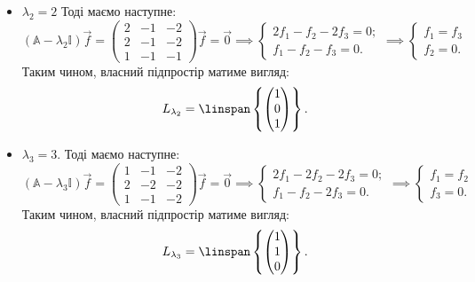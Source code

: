 \documentclass{math_library}
\begin{document}
\begin{example}
\begin{enumerate}[wide=0pt,label={\Roman*.}]
\begin{itemize}[wide=0pt]
\item $\lambda_2 = 2$
Тоді маємо наступне:
\[
(\mathbb{A} - \lambda_2 \mathbb{I})\vec{f} =\begin{pmatrix}
2 & -1 & -2 \\
2 & -1 & -2 \\
1 & -1 & -1
\end{pmatrix} \vec{f} = \vec{0} \implies \begin{cases} 2f_1 - f_2 - 2f_3 = 0; \\ f_1 - f_2 - f_3 = 0. \end{cases} \implies \begin{cases} f_1 = f_3 \\ f_2 = 0. \end{cases}
\]
Таким чином, власний підпростір матиме вигляд: 
\[
L_{\lambda_2} = \linspan\left\{ \begin{pmatrix}
1 \\ 0 \\ 1
\end{pmatrix} \right\}.
\]

\item $\lambda_3 = 3$.
Тоді маємо наступне:
\[
(\mathbb{A} - \lambda_3 \mathbb{I})\vec{f} =\begin{pmatrix}
1 & -1 & -2 \\
2 & -2 & -2 \\
1 & -1 & -2
\end{pmatrix} \vec{f} = \vec{0} \implies \begin{cases} 2f_1 - 2f_2 - 2f_3 = 0; \\ f_1 - f_2 - 2f_3 = 0. \end{cases} \implies \begin{cases} f_1 = f_2 \\ f_3 = 0. \end{cases}
\]
Таким чином, власний підпростір матиме вигляд:
\[
L_{\lambda_3} = \linspan\left\{ \begin{pmatrix}
1 \\ 1 \\ 0
\end{pmatrix} \right\}.
\]
\end{itemize}
\end{enumerate}
\end{example}
\end{document}
